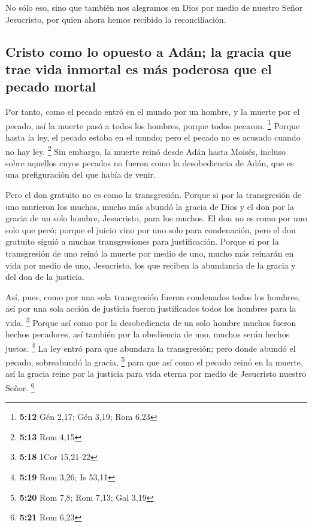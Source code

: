 \begin{paracol}{2}
 No sólo eso, sino que también nos alegramos en Dios por
medio de nuestro Señor Jesucristo, por quien ahora hemos recibido la
reconciliación.

\hypertarget{cristo-como-lo-opuesto-a-aduxe1n-la-gracia-que-trae-vida-inmortal-es-muxe1s-poderosa-que-el-pecado-mortal}{%
\subsection{Cristo como lo opuesto a Adán; la gracia que trae vida
inmortal es más poderosa que el pecado
mortal}\label{cristo-como-lo-opuesto-a-aduxe1n-la-gracia-que-trae-vida-inmortal-es-muxe1s-poderosa-que-el-pecado-mortal}}

 Por tanto, como el pecado entró en el mundo por un
hombre, y la muerte por el pecado, así la muerte pasó a todos los
hombres, porque todos pecaron. \footnote{\textbf{5:12} Gén 2,17; Gén
  3,19; Rom 6,23}  Porque hasta la ley, el pecado estaba
en el mundo; pero el pecado no es acusado cuando no hay ley. \footnote{\textbf{5:13}
  Rom 4,15}  Sin embargo, la muerte reinó desde Adán
hasta Moisés, incluso sobre aquellos cuyos pecados no fueron como la
desobediencia de Adán, que es una prefiguración del que había de venir.

 Pero el don gratuito no es como la transgresión. Porque
si por la transgresión de uno murieron los muchos, mucho más abundó la
gracia de Dios y el don por la gracia de un solo hombre, Jesucristo,
para los muchos.  El don no es como por uno solo que
pecó; porque el juicio vino por uno solo para condenación, pero el don
gratuito siguió a muchas transgresiones para justificación.
 Porque si por la transgresión de uno reinó la muerte por
medio de uno, mucho más reinarán en vida por medio de uno, Jesucristo,
los que reciben la abundancia de la gracia y del don de la justicia.

 Así, pues, como por una sola transgresión fueron
condenados todos los hombres, así por una sola acción de justicia fueron
justificados todos los hombres para la vida. \footnote{\textbf{5:18}
  1Cor 15,21-22}  Porque así como por la desobediencia de
un solo hombre muchos fueron hechos pecadores, así también por la
obediencia de uno, muchos serán hechos justos. \footnote{\textbf{5:19}
  Rom 3,26; Is 53,11}  La ley entró para que abundara la
transgresión; pero donde abundó el pecado, sobreabundó la gracia,
\footnote{\textbf{5:20} Rom 7,8; Rom 7,13; Gal 3,19} 
para que así como el pecado reinó en la muerte, así la gracia reine por
la justicia para vida eterna por medio de Jesucristo nuestro Señor.
\footnote{\textbf{5:21} Rom 6,23}


\end{paracol}
